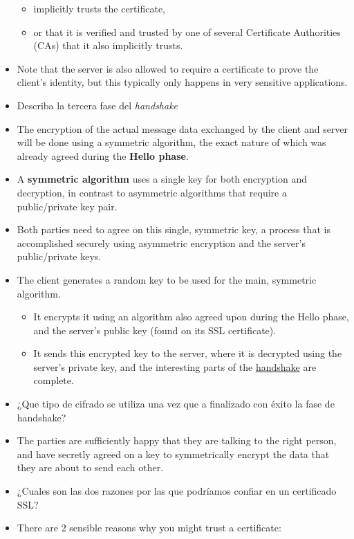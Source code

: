 \begin{itemize}
  \begin{itemize}
  \itemsep1pt\parskip0pt
  \item
    implicitly trusts the certificate,
  \item
    or that it is verified and trusted by one of several Certificate
    Authorities (CAs) that it also implicitly trusts.
  \end{itemize}
\item
  Note that the server is also allowed to require a certificate to prove
  the client's identity, but this typically only happens in very
  sensitive applications.
\item
  Describa la tercera fase del \emph{handshake}
\item
  The encryption of the actual message data exchanged by the client and
  server will be done using a symmetric algorithm, the exact nature of
  which was already agreed during the \textbf{Hello phase}.
\item
  A \textbf{symmetric algorithm} uses a single key for both encryption
  and decryption, in contrast to asymmetric algorithms that require a
  public/private key pair.
\item
  Both parties need to agree on this single, symmetric key, a process
  that is accomplished securely using asymmetric encryption and the
  server's public/private keys.
\item
  The client generates a random key to be used for the main, symmetric
  algorithm.

  \begin{itemize}
  \itemsep1pt\parskip0pt
  \item
    It encrypts it using an algorithm also agreed upon during the Hello
    phase, and the server's public key (found on its SSL certificate).
  \item
    It sends this encrypted key to the server, where it is decrypted
    using the server's private key, and the interesting parts of the
    \href{http://www.dictionary.com/browse/handshake}{handshake} are
    complete.
  \end{itemize}
\item
  ¿Que tipo de cifrado se utiliza una vez que a finalizado con éxito la
  fase de handshake?
\item
  The parties are sufficiently happy that they are talking to the right
  person, and have secretly agreed on a key to symmetrically encrypt the
  data that they are about to send each other.
\item
  ¿Cuales son las dos razones por las que podríamos confiar en un
  certificado SSL?
\item
  There are 2 sensible reasons why you might trust a certificate:


\end{itemize}
